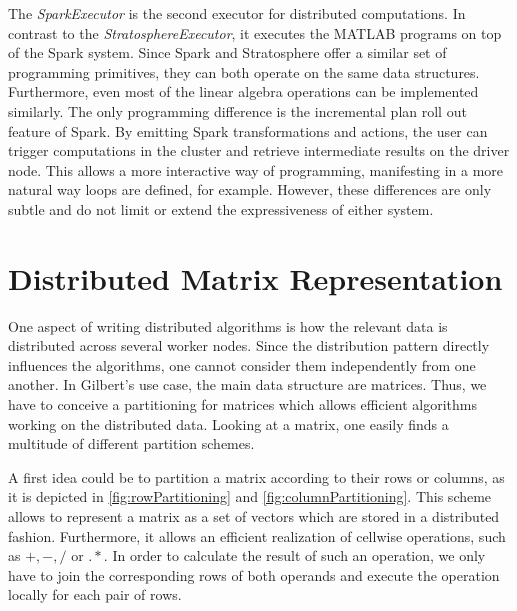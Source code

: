 The \emph{SparkExecutor} is the second executor for distributed computations.
In contrast to the \emph{StratosphereExecutor}, it executes the MATLAB programs on top of the Spark system.
Since Spark and Stratosphere offer a similar set of programming primitives, they can both operate on the same data structures.
Furthermore, even most of the linear algebra operations can be implemented similarly.
The only programming difference is the incremental plan roll out feature of Spark.
By emitting Spark transformations and actions, the user can trigger computations in the cluster and retrieve intermediate results on the driver node.
This allows a more interactive way of programming, manifesting in a more natural way loops are defined, for example.
However, these differences are only subtle and do not limit or extend the expressiveness of either system.

\section{Distributed Matrix Representation}
\label{sec:DistributedMatrixRepresentation}

One aspect of writing distributed algorithms is how the relevant data is distributed across several worker nodes.
Since the distribution pattern directly influences the algorithms, one cannot consider them independently from one another.
In Gilbert's use case, the main data structure are matrices.
Thus, we have to conceive a partitioning for matrices which allows efficient algorithms working on the distributed data.
Looking at a matrix, one easily finds a multitude of different partition schemes.

A first idea could be to partition a matrix according to their rows or columns, as it is depicted in \cref{fig:rowPartitioning} and \cref{fig:columnPartitioning}.
This scheme allows to represent a matrix as a set of vectors which are stored in a distributed fashion.
Furthermore, it allows an efficient realization of cellwise operations, such as $+,-,/$ or $.*$.
In order to calculate the result of such an operation, we only have to join the corresponding rows of both operands and execute the operation locally for each pair of rows.

